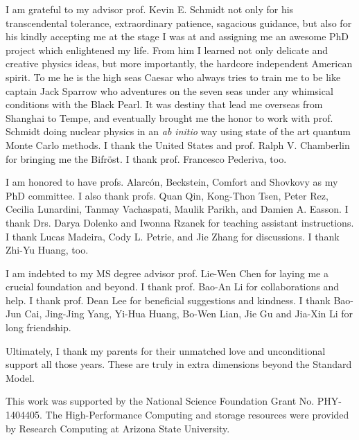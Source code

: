 \documentclass[12pt,letterpaper,UTF8]{report}
\begin{document}
\begin{acknowledgements}\hypertarget{ackhyper}{}I am grateful to my advisor prof. Kevin E. Schmidt not only for his transcendental tolerance, extraordinary patience, sagacious guidance, but also for his kindly accepting me at the stage I was at and assigning me an awesome PhD project which enlightened my life.
From him I learned not only delicate and creative physics ideas, but more importantly, the hardcore independent American spirit.
To me he is the high seas Caesar who always tries to train me to be like captain Jack Sparrow who adventures on the seven seas under any whimsical conditions with the Black Pearl.
It was destiny that lead me overseas from Shanghai to Tempe, and eventually brought me the honor to work with prof. Schmidt doing nuclear physics in an \textit{ab initio} way using state of the art quantum Monte Carlo methods.
I thank the United States and prof. Ralph V. Chamberlin for bringing me the Bifr\"{o}st.
I thank prof. Francesco Pederiva, too.

I am honored to have profs. Alarc\'{o}n, Beckstein, Comfort and Shovkovy as my PhD committee.
I also thank profs. Quan Qin, Kong-Thon Tsen, Peter Rez, Cecilia Lunardini, Tanmay Vachaspati, Maulik Parikh, and Damien A. Easson.
I thank Drs. Darya Dolenko and Iwonna Rzanek for teaching assistant instructions.
I thank Lucas Madeira, Cody L. Petrie, and Jie Zhang for discussions.
I thank Zhi-Yu Huang, too.

I am indebted to my MS degree advisor prof. Lie-Wen Chen for laying me a crucial foundation and beyond.
I thank prof. Bao-An Li for collaborations and help.
I thank prof. Dean Lee for beneficial suggestions and kindness.
I thank Bao-Jun Cai, Jing-Jing Yang, Yi-Hua Huang, Bo-Wen Lian, Jie Gu and Jia-Xin Li for long friendship.

Ultimately, I thank my parents for their unmatched love and unconditional support all those years.
These are truly in extra dimensions beyond the Standard Model.

This work was supported by the National Science Foundation Grant No. PHY-1404405.
The High-Performance Computing and storage resources were provided by Research Computing at Arizona State University.
\end{acknowledgements}
%

\cleardoublepage

\pagestyle{styletoc}
\tableofcontents
\end{document}
